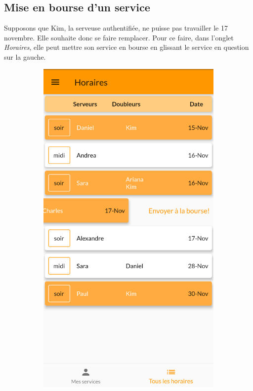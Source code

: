     \subsection*{Mise en bourse d'un service}
    Supposons que Kim, la serveuse authentifiée, ne puisse pas travailler le 17 novembre.
    Elle souhaite donc se faire remplacer. Pour ce faire, dans l'onglet 
    \textit{Horaires}, elle peut mettre son service en bourse en glissant le 
    service en question sur la gauche.
    \begin{figure}[!h]
        \centering
        \begin{subfigure}{.3\textwidth}
            \centering
            \includegraphics[width=0.9\linewidth]{screenshots/scenario_02/mise_en_bourse.png}

\end{subfigure}
\end{figure}
